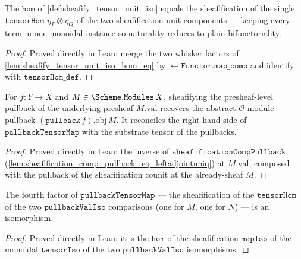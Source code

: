 \begin{lemma}\leanok
  \label{lem:sheafify_tensor_unit_iso_hom_eq_prime}
  The \(\mathtt{hom}\) of \cref{def:sheafify_tensor_unit_iso} equals the sheafification of
  the single \(\mathtt{tensorHom}\) \(\eta_P \otimes \eta_Q\) of the two sheafification-unit
  components --- keeping every term in one monoidal instance so naturality reduces to plain
  bifunctoriality.
\end{lemma}
\begin{proof}
  \leanok
  Proved directly in Lean: merge the two whisker factors of
  \cref{lem:sheafify_tensor_unit_iso_hom_eq} by \(\mathtt{\leftarrow Functor.map\_comp}\)
  and identify with \(\mathtt{tensorHom\_def}\).
\end{proof}

\begin{definition}\leanok
  \label{def:pullback_val_iso}
  For \(f : Y \to X\) and \(M \in \Scheme.\mathtt{Modules}\,X\), sheafifying the
  presheaf-level pullback of the underlying presheaf \(M.\mathrm{val}\) recovers the
  abstract \(\mathcal{O}\)-module pullback \((\mathtt{pullback}\,f).\mathrm{obj}\,M\). It
  reconciles the right-hand side of \(\mathtt{pullbackTensorMap}\) with the substrate
  tensor of the pullbacks.
\end{definition}
\begin{proof}
  \leanok
  Proved directly in Lean: the inverse of
  \(\mathtt{sheafificationCompPullback}\) (\cref{lem:sheafification_comp_pullback_eq_leftadjointuniq})
  at \(M.\mathrm{val}\), composed with the pullback of the sheafification counit at the
  already-sheaf \(M\).
\end{proof}

\begin{lemma}\leanok
  \label{lem:isiso_sheafify_tensorhom_pullbackvaliso}
  The fourth factor of \(\mathtt{pullbackTensorMap}\) --- the sheafification of the
  \(\mathtt{tensorHom}\) of the two \(\mathtt{pullbackValIso}\) comparisons (one for \(M\),
  one for \(N\)) --- is an isomorphism.
\end{lemma}
\begin{proof}
  \leanok
  Proved directly in Lean: it is the \(\mathtt{hom}\) of the sheafification \(\mathtt{mapIso}\)
  of the monoidal \(\mathtt{tensorIso}\) of the two \(\mathtt{pullbackValIso}\) isomorphisms.
\end{proof}

